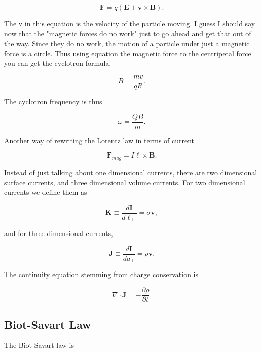 \documentclass[preprint, review,12pt]{elsarticle}
\def\x{\times}
\def\.{\cdot}
\def\b{\textbf}
\def\bell{\bm{\ell}}
\def\={\equiv}
\def\div{\nabla \.}
\begin{document}
\begin{equation}
    \b{F} = q(\b{E} + \b{v} \x \b{B}).
\end{equation}

The v in this equation is the velocity of the particle moving. I guess I should say now that the "magnetic forces do no work" just to go ahead and get that out of the way. Since they do no work, the motion of a particle under just a magnetic force is a circle. Thus using equation the magnetic force to the centripetal force you can get the cyclotron formula,

\begin{equation}
    B = \frac{mv}{qR}.
\end{equation}

The cyclotron frequency is thus

\begin{equation}
    \omega = \frac{QB}{m}.
\end{equation}

Another way of rewriting the Lorentz law in terms of current

\begin{equation}
    \b{F}_{mag} = I \bell \x \b{B}.
\end{equation}

Instead of just talking about one dimensional currents, there are two dimensional surface currents, and three dimensional volume currents. For two dimensional currents we define them as

\begin{equation}
    \b{K} \= \frac{d\b{I}}{d\ell_\bot} = \sigma \b{v},
\end{equation}

and for three dimensional currents,

\begin{equation}
    \b{J} \= \frac{d\b{I}}{da_\bot} =\rho \b{v}.
\end{equation}

The continuity equation stemming from charge conservation is

\begin{equation}
    \div \b{J} = - \frac{\partial \rho}{\partial t}.
\end{equation}

\subsection{Biot-Savart Law}

The Biot-Savart law is
\end{document}
